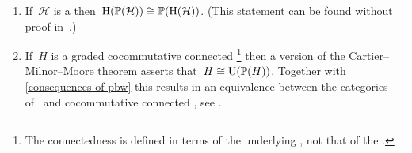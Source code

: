 \documentclass[a4paper,10pt,headings=standardclasses]{scrartcl}
\begin{document}
\begin{remark}
  \leavevmode
  \begin{enumerate}
    \item
      If~$\mathcal{H}$ is a {\dgh} then~$\operatorname{H}(\mathbb{P}(\mathcal{H})) \cong \mathbb{P}(\operatorname{H}(\mathcal{H}))$.
      (This statement can be found without proof in~\cite[Theorem~A.9]{loday}.)
    \item
      If~$H$ is a graded cocommutative connected%
      \footnote{The connectedness is defined in terms of the underlying {\dgc}, not that of the {\dga}.}
      {\dgh} then a version of the Cartier--Milnor--Moore theorem asserts that~$H \cong \operatorname{U}(\mathbb{P}(H))$.
      Together with \cref{consequences of pbw} this results in an equivalence between the categories of~{\dgls} and cocommutative connected {\dghs}, see \cite[Appendix~B,Theorem~4.5]{quillen}.
  \end{enumerate}
\end{remark}





\appendix
\end{document}

